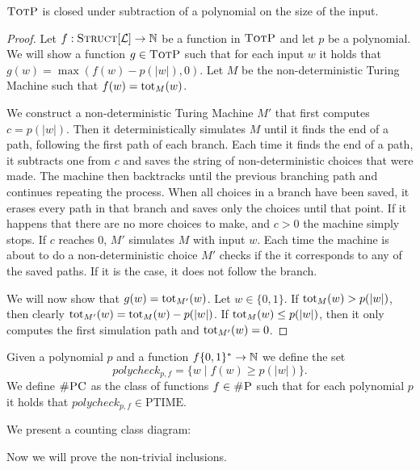 \begin{theo}
	$\textsc{TotP}$ is closed under subtraction of a polynomial on the size of the input.
\end{theo}
\begin{proof}
	Let $f:\textsc{Struct}[{\cal L}]\to\mathbb{N}$ be a function in $\textsc{TotP}$ and let $p$ be a polynomial. We will show a function $g\in\textsc{TotP}$ such that for each input $w$ it holds that $g(w) = \max(f(w) - p(\vert w \vert),0)$. Let $M$ be the non-deterministic Turing Machine such that $f(w) = \text{tot}_M(w)$. 
	
	We construct a non-deterministic Turing Machine $M'$ that first computes $c = p(\vert w \vert)$. Then it deterministically simulates $M$ until it finds the end of a path, following the first path of each branch. Each time it finds the end of a path, it subtracts one from $c$ and saves the string of non-deterministic choices that were made. The machine then backtracks until the previous branching path and continues repeating the process. When all choices in a branch have been saved, it erases every path in that branch and saves only the choices until that point. If it happens that there are no more choices to make, and $c > 0$ the machine simply stops. If $c$ reaches 0, $M'$ simulates $M$ with input $w$. Each time the machine is about to do a non-deterministic choice $M'$ checks if the it corresponds to any of the saved paths. If it is the case, it does not follow the branch.
	
	We will now show that $g(w) = \text{tot}_{M'}(w)$. Let $w\in\{0,1\}$. If $\text{tot}_{M}(w) > p(\vert w \vert)$, then clearly $\text{tot}_{M'}(w) = \text{tot}_{M}(w) - p(\vert w \vert)$. If $\text{tot}_{M}(w) \leq p(\vert w \vert)$, then it only computes the first simulation path and $\text{tot}_{M'}(w) = 0$.
\end{proof}

Given a polynomial $p$ and a function $f\{0,1\}^*\to\mathbb{N}$ we define the set
\[
	polycheck_{p,f} = \{w\mid f(w) \geq p(\vert w \vert) \}.
\]
We define $\textsc{\#PC}$ as the class of functions $f\in\textsc{\#P}$ such that for each polynomial $p$ it holds that $polycheck_{p,f}\in \text{PTIME}$.

We present a counting class diagram:



Now we will prove the non-trivial inclusions.

